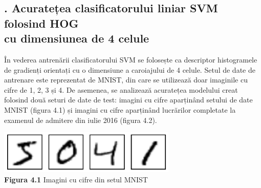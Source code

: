 \documentclass[a4paper,12pt]{report}
\newcommand\tab[1][1cm]{\hspace*{#1}}
\begin{document}
\subsection*{. Acuratețea clasificatorului liniar SVM folosind HOG\\ cu dimensiunea de 4 celule}
\tab În vederea antrenării clasificatorului SVM se folosește ca descriptor histogramele de gradienți orientați cu o dimensiune a caroiajului de 4 celule. Setul de date de antrenare este reprezentat de MNIST, din care se utilizează doar imaginile cu cifre de 1, 2, 3 și 4. De asemenea, se analizează acuratețea modelului creat folosind două seturi de date de test: imagini cu cifre aparținând setului de date MNIST (figura 4.1) și imagini cu cifre aparținând lucrărilor completate la examenul de admitere din iulie 2016 (figura 4.2).
\begin {center} 
	\begin {footnotesize} 
		\includegraphics[width = 85mm]{fig2_15} \\
		\textbf  {Figura 4.1} Imagini cu cifre din setul MNIST
	\end {footnotesize} 
\end {center}
\end{document}
